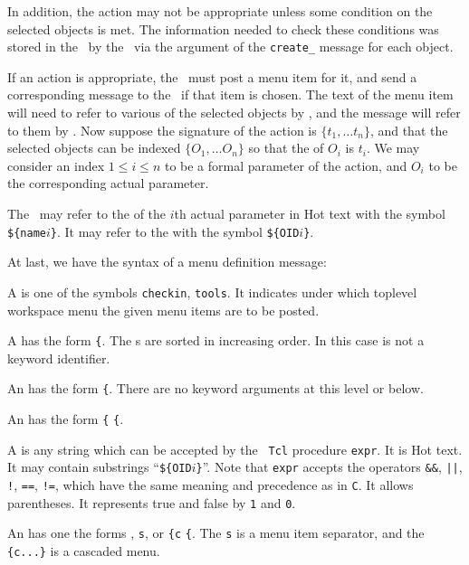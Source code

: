 In addition, the action may not be appropriate unless some condition
on the selected objects is met. The information needed to check these
conditions was stored in the \FE\ by the \SM\ via the
 argument of the {\tt create\_} message for each
object.

If an action is appropriate, the \FE\ must post a menu item for it,
and send a corresponding message to the \SM\ if that item is
chosen. The text of the menu item will need to refer to various of the
selected objects by , and the message will refer to them by
. Now suppose the signature of the action is
$\{t_1,\dots t_n\}$, and that the selected objects can be indexed
$\{O_1,\dots O_n\}$ so that the  of $O_i$ is $t_i$. We
may consider an index $1\le i\le n$ to be a formal parameter of the
action, and $O_i$ to be the corresponding actual parameter.

The \SM\ may refer to the  of the $i$th actual parameter in
{\sf Hot} text with the symbol {\tt \$\{name}$i${\tt\}}. It may refer
to the  with the symbol {\tt \$\{OID}$i${\tt\}}.

At last, we have the syntax of a menu definition message:


A  is one of the symbols {\tt checkin}, {\tt tools}. It
indicates under which toplevel workspace menu the given menu items are
to be posted.

A  has the form {\tt\{}. The
s are sorted in increasing order. In this case
 is not a keyword identifier.

An  has the form {\tt\{}.
 There are no keyword arguments at this level or below.

An  has the form {\tt\{}
{\tt\{}.

A  is any string which can be accepted by the {\tt
Tcl} procedure {\tt expr}. It is {\sf Hot} text. It may contain
substrings ``{\tt\$\{OID}$i${\tt\}}''. Note that {\tt expr} accepts
the operators {\tt \&\&}, {\tt ||}, {\tt !}, {\tt ==}, {\tt !=}, which
have the same meaning and precedence as in {\tt C}. It allows
parentheses. It represents true and false by {\tt 1} and {\tt 0}.

An  has one the forms
, {\tt s}, or
{\tt\{c}  {\tt\{}.
The {\tt s}  is a menu item separator, and the {\tt\{c...\}}
 is a cascaded menu.

